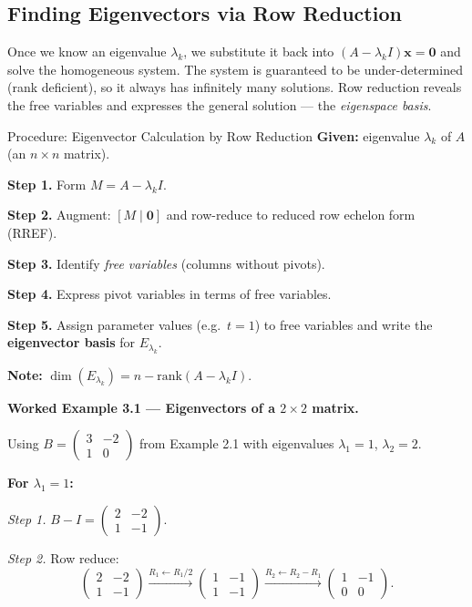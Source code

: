 \documentclass[12pt,a4paper]{article}
\begin{document}
\subsection{Finding Eigenvectors via Row Reduction}

Once we know an eigenvalue $\lambda_k$, we substitute it back into $(A - \lambda_k I)\mathbf{x} = \mathbf{0}$
and solve the homogeneous system. The system is guaranteed to be under-determined (rank deficient),
so it always has infinitely many solutions. Row reduction reveals the free variables and expresses the
general solution --- the \emph{eigenspace basis}.

\begin{infobox}{Procedure: Eigenvector Calculation by Row Reduction}
\textbf{Given:} eigenvalue $\lambda_k$ of $A$ (an $n\times n$ matrix).

\textbf{Step 1.} Form $M = A - \lambda_k I$.

\textbf{Step 2.} Augment: $[M \mid \mathbf{0}]$ and row-reduce to reduced row echelon form (RREF).

\textbf{Step 3.} Identify \emph{free variables} (columns without pivots).

\textbf{Step 4.} Express pivot variables in terms of free variables.

\textbf{Step 5.} Assign parameter values (e.g.\ $t=1$) to free variables and write
the \textbf{eigenvector basis} for $E_{\lambda_k}$.

\textbf{Note:} $\dim(E_{\lambda_k}) = n - \text{rank}(A - \lambda_k I)$.
\end{infobox}

\textbf{Worked Example 3.1 --- Eigenvectors of a $2\times 2$ matrix.}

Using $B = \begin{pmatrix} 3 & -2 \\ 1 & 0 \end{pmatrix}$ from Example 2.1 with eigenvalues $\lambda_1 = 1$, $\lambda_2 = 2$.

\textbf{For $\lambda_1 = 1$:}

\textit{Step 1.} $B - I = \begin{pmatrix} 2 & -2 \\ 1 & -1 \end{pmatrix}$.

\textit{Step 2.} Row reduce:
\[
  \begin{pmatrix} 2 & -2 \\ 1 & -1 \end{pmatrix}
  \xrightarrow{R_1 \leftarrow R_1/2}
  \begin{pmatrix} 1 & -1 \\ 1 & -1 \end{pmatrix}
  \xrightarrow{R_2 \leftarrow R_2 - R_1}
  \begin{pmatrix} 1 & -1 \\ 0 & 0 \end{pmatrix}.
\]
\end{document}
